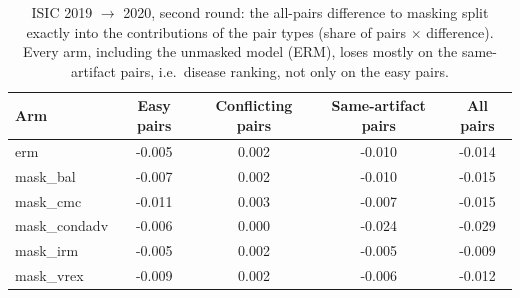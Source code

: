 \begin{table}[H]\centering\scriptsize
\caption{ISIC 2019 $\to$ 2020, second round: the all-pairs difference to masking split exactly into the contributions of the pair types (share of pairs $\times$ difference). Every arm, including the unmasked model (ERM), loses mostly on the same-artifact pairs, i.e.\ disease ranking, not only on the easy pairs.}\label{tab:s17decomp}
\begin{tabular}{lcccc}\toprule
Arm & Easy pairs & Conflicting pairs & Same-artifact pairs & All pairs \\\midrule
erm & -0.005 & 0.002 & -0.010 & -0.014 \\
mask\_bal & -0.007 & 0.002 & -0.010 & -0.015 \\
mask\_cmc & -0.011 & 0.003 & -0.007 & -0.015 \\
mask\_condadv & -0.006 & 0.000 & -0.024 & -0.029 \\
mask\_irm & -0.005 & 0.002 & -0.005 & -0.009 \\
mask\_vrex & -0.009 & 0.002 & -0.006 & -0.012 \\
\bottomrule\end{tabular}
\end{table}
